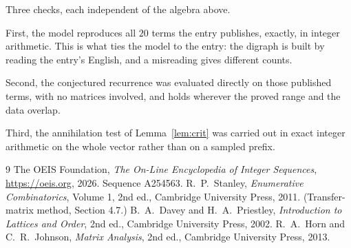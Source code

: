 \documentclass[11pt,a4paper]{article}
\theoremstyle{plain}
\theoremstyle{definition}
\begin{document}
Three checks, each independent of the algebra above.

First, the model reproduces all $20$ terms the entry publishes, exactly, in integer
arithmetic. This is what ties the model to the entry: the digraph is built by reading the
entry's English, and a misreading gives different counts.

Second, the conjectured recurrence was evaluated directly on those published terms, with no
matrices involved, and holds wherever the proved range and the data overlap.

Third, the annihilation test of Lemma~\ref{lem:crit} was carried out in exact integer
arithmetic on the whole vector rather than on a sampled prefix.

\begin{thebibliography}{9}
 The OEIS Foundation, \emph{The On-Line Encyclopedia of Integer
Sequences}, \url{https://oeis.org}, 2026. Sequence A254563.
 R.~P.~Stanley, \emph{Enumerative Combinatorics}, Volume 1, 2nd ed.,
Cambridge University Press, 2011. (Transfer-matrix method, Section 4.7.)
 B.~A.~Davey and H.~A.~Priestley, \emph{Introduction to Lattices and
Order}, 2nd ed., Cambridge University Press, 2002.
 R.~A.~Horn and C.~R.~Johnson, \emph{Matrix Analysis}, 2nd ed., Cambridge
University Press, 2013.
\end{thebibliography}
\end{document}
